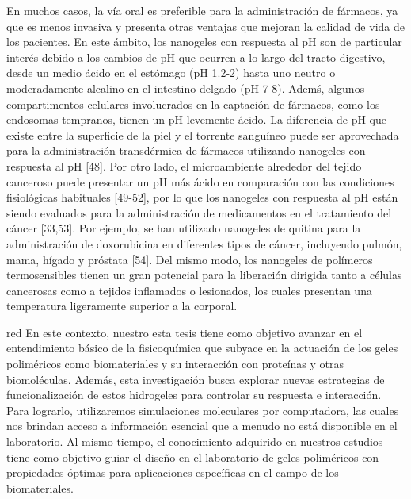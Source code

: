 En muchos casos, la v\'ia oral es preferible para la administraci\'on de f\'armacos, ya que es menos invasiva y presenta otras ventajas que mejoran la calidad de vida de los pacientes. En este \'ambito, los nanogeles con respuesta al pH son de particular inter\'es debido a los cambios de pH que ocurren a lo largo del tracto digestivo, desde un medio \'acido en el est\'omago (pH 1.2-2) hasta uno neutro o moderadamente alcalino en el intestino delgado (pH 7-8). Adem\'s, algunos compartimentos celulares involucrados en la captaci\'on de f\'armacos, como los endosomas tempranos, tienen un pH levemente \'acido. La diferencia de pH que existe entre la superficie de la piel  y el torrente sangu\'ineo puede ser aprovechada para la administraci\'on transd\'ermica de f\'armacos utilizando nanogeles con respuesta al pH [48]. Por otro lado, el microambiente alrededor del tejido canceroso puede presentar un pH m\'as ácido en comparaci\'on con las condiciones fisiol\'ogicas habituales [49-52], por lo que los nanogeles con respuesta al pH est\'an siendo evaluados para la administraci\'on de medicamentos en el tratamiento del c\'ancer [33,53]. Por ejemplo, se han utilizado nanogeles de quitina para la administraci\'on de doxorubicina en diferentes tipos de c\'ancer, incluyendo pulm\'on, mama, h\'igado y pr\'ostata [54]. Del mismo modo, los nanogeles de pol\'imeros termosensibles tienen un gran potencial para la liberaci\'on dirigida tanto a c\'elulas cancerosas como a tejidos inflamados o lesionados, los cuales presentan una temperatura ligeramente superior a la corporal.

	


	
\begin{color}{red}
En este contexto, nuestro esta tesis tiene como objetivo avanzar en el entendimiento b\'asico de la fisicoqu\'imica que subyace en la actuaci\'on de los geles polim\'ericos como biomateriales y su interacci\'on con prote\'inas y otras biomol\'eculas. Adem\'as, esta investigaci\'on busca explorar nuevas estrategias de funcionalizaci\'on de estos hidrogeles para controlar su respuesta e interacci\'on. Para lograrlo, utilizaremos simulaciones moleculares por computadora, las cuales nos brindan acceso a informaci\'on esencial que a menudo no est\'a disponible en el laboratorio. Al mismo tiempo, el conocimiento adquirido en nuestros estudios tiene como objetivo guiar el dise\~no en el laboratorio de geles polim\'ericos con propiedades \'optimas para aplicaciones espec\'ificas en el campo de los biomateriales.

\end{color}


